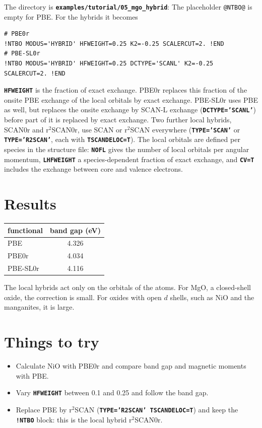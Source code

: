 \documentclass[11pt,a4paper,oneside]{book}
\newcommand{\key}[1]{\textbf{\texttt{#1}}}
\newcommand{\file}[1]{\textbf{\texttt{#1}}}
\newcommand{\deck}[1]{{\small}}
\begin{document}
The directory is \file{examples/tutorial/05\_mgo\_hybrid}:
\deck{../../../examples/tutorial/05_mgo_hybrid/mgo.cntl}
The placeholder \texttt{@NTBO@} is empty for PBE. For the hybrids it
becomes
\begin{verbatim}
# PBE0r
!NTBO MODUS='HYBRID' HFWEIGHT=0.25 K2=-0.25 SCALERCUT=2. !END
# PBE-SL0r
!NTBO MODUS='HYBRID' HFWEIGHT=0.25 DCTYPE='SCANL' K2=-0.25 SCALERCUT=2. !END
\end{verbatim}
\key{HFWEIGHT} is the fraction of exact exchange. PBE0r replaces this
fraction of the onsite PBE exchange of the local orbitals by exact
exchange. PBE-SL0r uses PBE as well, but replaces the onsite exchange
by SCAN-L exchange (\key{DCTYPE='SCANL'}) before part of it is replaced
by exact exchange. Two further local hybrids, SCAN0r and r$^2$SCAN0r, use
SCAN or r$^2$SCAN everywhere (\key{TYPE='SCAN'} or \key{TYPE='R2SCAN'},
each with \key{TSCANDELOC=T}). The local
orbitals are defined per species in the structure file:
\deck{../../../examples/tutorial/05_mgo_hybrid/mgo.strc}
\key{NOFL} gives the number of local orbitals per angular momentum,
\key{LHFWEIGHT} a species-dependent fraction of exact exchange, and
\key{CV=T} includes the exchange between core and valence electrons.

\section{Results}

\begin{center}
\begin{tabular}{lc}\toprule
functional & band gap (eV) \\ \midrule
PBE & 4.326 \\ PBE0r & 4.034 \\ PBE-SL0r & 4.116 \\ \bottomrule
\end{tabular}
\end{center}
The local hybrids act only on the orbitals of the atoms. For MgO, a
closed-shell oxide, the correction is small. For oxides with open $d$
shells, such as NiO and the manganites, it is large.

\section{Things to try}
\begin{itemize}
\item Calculate NiO with PBE0r and compare band gap and magnetic
  moments with PBE.
\item Vary \key{HFWEIGHT} between 0.1 and 0.25 and follow the band gap.
\item Replace PBE by r$^2$SCAN (\key{TYPE='R2SCAN' TSCANDELOC=T}) and
  keep the \key{!NTBO} block: this is the local hybrid r$^2$SCAN0r.
\end{itemize}
\end{document}
